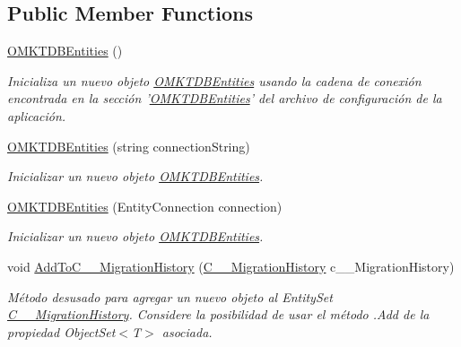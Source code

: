 \subsection*{Public Member Functions}
\begin{DoxyCompactItemize}
\item 
\hyperlink{class_microsoft_1_1_samples_1_1_kinect_1_1_basic_interactions_1_1_o_m_k_t_d_b_entities_a46ad99b41c604c04062174bbb57190f6}{O\-M\-K\-T\-D\-B\-Entities} ()
\begin{DoxyCompactList}\small\item\em Inicializa un nuevo objeto \hyperlink{class_microsoft_1_1_samples_1_1_kinect_1_1_basic_interactions_1_1_o_m_k_t_d_b_entities}{O\-M\-K\-T\-D\-B\-Entities} usando la cadena de conexión encontrada en la sección '\hyperlink{class_microsoft_1_1_samples_1_1_kinect_1_1_basic_interactions_1_1_o_m_k_t_d_b_entities}{O\-M\-K\-T\-D\-B\-Entities}' del archivo de configuración de la aplicación. \end{DoxyCompactList}\item 
\hyperlink{class_microsoft_1_1_samples_1_1_kinect_1_1_basic_interactions_1_1_o_m_k_t_d_b_entities_ad3e77e911f7919e4e535bd20fe90cafb}{O\-M\-K\-T\-D\-B\-Entities} (string connection\-String)
\begin{DoxyCompactList}\small\item\em Inicializar un nuevo objeto \hyperlink{class_microsoft_1_1_samples_1_1_kinect_1_1_basic_interactions_1_1_o_m_k_t_d_b_entities}{O\-M\-K\-T\-D\-B\-Entities}. \end{DoxyCompactList}\item 
\hyperlink{class_microsoft_1_1_samples_1_1_kinect_1_1_basic_interactions_1_1_o_m_k_t_d_b_entities_a822b2341b6af717753d6a58e28a1579a}{O\-M\-K\-T\-D\-B\-Entities} (Entity\-Connection connection)
\begin{DoxyCompactList}\small\item\em Inicializar un nuevo objeto \hyperlink{class_microsoft_1_1_samples_1_1_kinect_1_1_basic_interactions_1_1_o_m_k_t_d_b_entities}{O\-M\-K\-T\-D\-B\-Entities}. \end{DoxyCompactList}\item 
void \hyperlink{class_microsoft_1_1_samples_1_1_kinect_1_1_basic_interactions_1_1_o_m_k_t_d_b_entities_a3bd143271837c4bfc5d272a70f3ed099}{Add\-To\-C\-\_\-\-\_\-\-Migration\-History} (\hyperlink{class_microsoft_1_1_samples_1_1_kinect_1_1_basic_interactions_1_1_c_____migration_history}{C\-\_\-\-\_\-\-Migration\-History} c\-\_\-\-\_\-\-Migration\-History)
\begin{DoxyCompactList}\small\item\em Método desusado para agregar un nuevo objeto al Entity\-Set \hyperlink{class_microsoft_1_1_samples_1_1_kinect_1_1_basic_interactions_1_1_c_____migration_history}{C\-\_\-\-\_\-\-Migration\-History}. Considere la posibilidad de usar el método .Add de la propiedad Object\-Set$<$T$>$ asociada. \end{DoxyCompactList}\item 

\end{DoxyCompactItemize}
